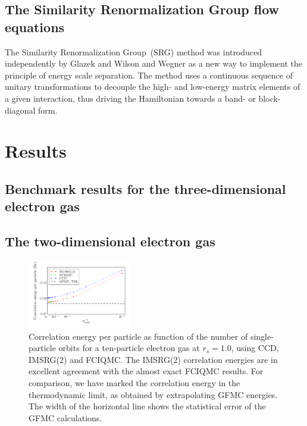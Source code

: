 \documentclass[aps,twocolumn,showpacs,floatfix,nofootinbib,preprintnumbers,superscriptaddress,amsmath,amssymb]{revtex4-1}
\begin{document}
\subsection{The Similarity Renormalization Group flow equations}
\label{subsec:SRG}
The Similarity Renormalization Group~(SRG) method was introduced
independently by Glazek and Wilson
\cite{PhysRevD.48.5863,*PhysRevD.49.4214} and Wegner
\cite{PhysRepWegner0,*PhysRepWegner} as a new way to implement the
principle of energy scale separation.  The method uses a continuous
sequence of unitary transformations to decouple the high- and
low-energy matrix elements of a given interaction, thus driving the
Hamiltonian towards a band- or block-diagonal form.




\section{Results}
\label{sec:results}
\subsection{Benchmark results for the three-dimensional electron gas}

\subsection{The two-dimensional electron gas}

\begin{figure}[hbtp]
     \begin{center}

            \includegraphics[width=0.4\textwidth]{figures/nOrbitsEneN10Rs10.pdf}
    \end{center}
    \caption{Correlation energy per particle as function of the number of
single-particle orbits for a ten-particle electron gas at $r_s=1.0$, using CCD, IMSRG(2) 
and FCIQMC. The IMSRG(2)
correlation energies are in excellent agreement with the almost
exact FCIQMC results. For comparison, we have marked the correlation
energy in the thermodynamic limit, as obtained by extrapolating GFMC
energies. The width of the horizontal line shows the statistical error of
the GFMC calculations.}
            \label{fig:N10}
\end{figure}
\end{document}
